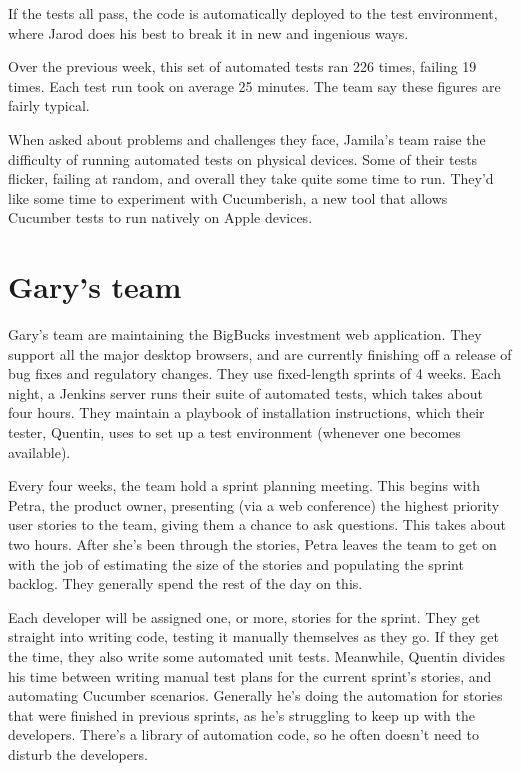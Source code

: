 If the tests all pass, the code is automatically deployed to the test environment, where Jarod does his best to break it in new and ingenious ways.

Over the previous week, this set of automated tests ran 226 times, failing 19 times. Each test run took on average 25 minutes. The team say these figures are fairly typical.

When asked about problems and challenges they face, Jamila's team raise the difficulty of running automated tests on physical devices. Some of their tests flicker, failing at random, and overall they take quite some time to run. They'd like some time to experiment with Cucumberish, a new tool that allows Cucumber tests to run natively on Apple devices.

\section*{Gary's team}

Gary's team are maintaining the BigBucks investment web application. They support all the major desktop browsers, and are currently finishing off a release of bug fixes and regulatory changes. They use fixed-length sprints of 4 weeks. Each night, a Jenkins server runs their suite of automated tests, which takes about four hours. They maintain a playbook of installation instructions, which their tester, Quentin, uses to set up a test environment (whenever one becomes available).

Every four weeks, the team hold a sprint planning meeting. This begins with Petra, the product owner, presenting (via a web conference) the highest priority user stories to the team, giving them a chance to ask questions. This takes about two hours. After she's been through the stories, Petra leaves the team to get on with the job of estimating the size of the stories and populating the sprint backlog. They generally spend the rest of the day on this.

Each developer will be assigned one, or more, stories for the sprint. They get straight into writing code, testing it manually themselves as they go. If they get the time, they also write some automated unit tests. Meanwhile, Quentin divides his time between writing manual test plans for the current sprint's stories, and automating Cucumber scenarios. Generally he's doing the automation for stories that were finished in previous sprints, as he's struggling to keep up with the developers. There's a library of automation code, so he often doesn't need to disturb the developers.

